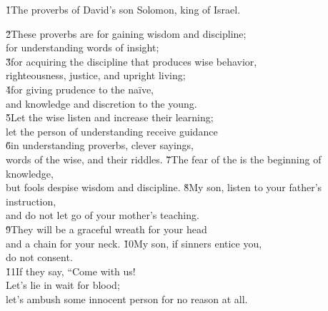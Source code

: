 


\v{1}The proverbs of David's son Solomon, king of Israel.

\begin{poetry}
\poeml \v{2}These proverbs are for gaining wisdom and discipline; \\
\poemll    for understanding words of insight; \\
\poeml \v{3}for acquiring the discipline that produces wise behavior, \\
\poemll    righteousness, justice, and upright living; \\
\poeml \v{4}for giving prudence to the na\"{i}ve, \\
\poemll    and knowledge and discretion to the young. \\
\poeml \v{5}Let the wise listen and increase their learning; \\
\poemll    let the person of understanding receive guidance \\
\poeml \v{6}in understanding proverbs, clever sayings, \\
\poemll    words of the wise, and their riddles.
\poeml \v{7}The fear of the  is the beginning of knowledge, \\
\poemll    but fools despise wisdom and discipline.
\poeml \v{8}My son, listen to your father's instruction, \\
\poemll    and do not let go of your mother's teaching. \\
\poeml \v{9}They will be a graceful wreath for your head \\
\poemll    and a chain for your neck.
\poeml \v{10}My son, if sinners entice you, \\
\poemll    do not consent. \\
\poeml \v{11}If they say, ``Come with us! \\
\poemll    Let's lie in wait for blood; \\
\poemlll       let's ambush some innocent person for no reason at all. \\

\end{poetry}
